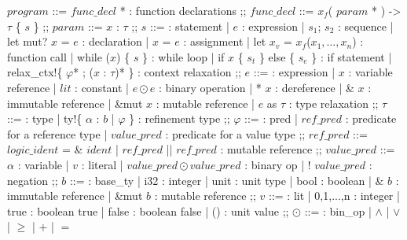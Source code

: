 \documentclass[twoside, english]{sdqthesis}
\newcommand{\ccolon}[0]{: }
\newcommand{\cmid}[0]{| }
\newcommand{\cdisj}[0]{|| }
\theoremstyle{definition}
\begin{document}
\begin{bnfgrammar}
  $program$  ::=
    $func\_decl$ * : function declarations
  ;;
  $func\_decl$ ::=
    $x_f$( $param$ * ) -> $\tau$ \{ $s$ \}
  ;;
  $param$ ::= $x$ \ccolon  $\tau$
  ;;
  $s$
  ::=                                                     : statement
    | $e$                                                 : expression
    | $s_1$; $s_2$                                        : sequence
    | let mut? $x$ = $e$                                  : declaration
    | $x$ = $e$                                           : assignment
    | let $x_v$ = $x_f$($x_1, \dots, x_n$)                : function call
    | while ($x$) \{ $s$ \}                               : while loop
    | if $x$ \{ $s_t$ \} else \{ $s_e$ \}               : if statement
    | relax\_ctx!\{ $\varphi$* ; ($x$ \ccolon $\tau$)* \} : context relaxation
  ;;
  $e$
  ::=                                                     : expression 
    | $x$                                                 : variable reference
    | $lit$                                               : constant
    | $e \odot e$                                         : binary operation
    | * $x$                                               : dereference
  | \& $x$                                                : immutable reference
  | \&mut $x$                                             : mutable reference
    | $e$ as $\tau$                                       : type relaxation
  ;;
  $\tau$
  ::=                                                     : type 
  | ty!\{ $\alpha$ \ccolon $b$ \cmid $\varphi$ \}         : refinement type
  ;;
  $\varphi$
    ::=                                                   : pred 
    | $ref\_pred$                                         : predicate for a reference type
    | $value\_pred$                                       : predicate for a value type
  ;;
  $ref\_pred$ ::=
    $logic\_ident$ = \& $ident$
    | $ref\_pred$ \cdisj $ref\_pred$         : mutable reference
  ;;
  $value\_pred$ ::=
    $\alpha$                                 : variable
  | $v$                                      : literal
  | $value\_pred \odot value\_pred$          : binary op
  | ! $value\_pred$                          : negation
  ;;
  $b$
    ::=                     : base\_ty
    | i32                   : integer
    | unit                  : unit type
    | bool                  : boolean
    | \& $b$                : immutable reference
    | \&mut $b$             : mutable reference
  ;;
  $v$
    ::=                     : lit 
    | 0,1,...,n             : integer
    | true                  : boolean true
    | false                 : boolean false
    | ()                    : unit value
  ;;
  $\odot$
    ::=                     : bin\_op 
    | $\wedge$ | $\vee$ | $\geq$ | $+$ | $=$
\end{bnfgrammar}
\end{document}
